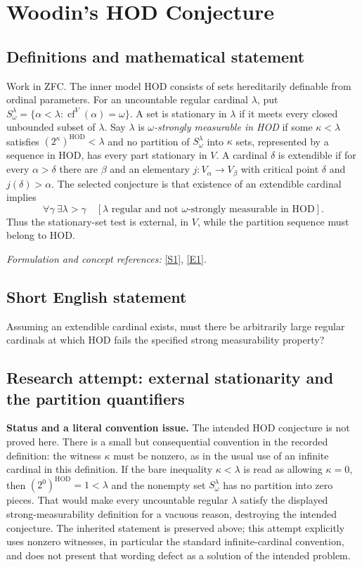 \documentclass[11pt]{article}
\begin{document}
\section*{\texorpdfstring{Woodin's HOD Conjecture}{Woodin's HOD Conjecture}}\label{statement}
\subsection{Definitions and mathematical statement}
Work in ZFC. The inner model $\mathrm{HOD}$ consists of sets hereditarily definable from ordinal parameters. For an uncountable regular cardinal $\lambda$, put $S^\lambda_\omega=\{\alpha<\lambda:\operatorname{cf}^V(\alpha)=\omega\}$. A set is stationary in $\lambda$ if it meets every closed unbounded subset of $\lambda$. Say $\lambda$ is \emph{$\omega$-strongly measurable in HOD} if some $\kappa<\lambda$ satisfies $(2^\kappa)^{\mathrm{HOD}}<\lambda$ and no partition of $S^\lambda_\omega$ into $\kappa$ sets, represented by a sequence in HOD, has every part stationary in $V$. A cardinal $\delta$ is extendible if for every $\alpha>\delta$ there are $\beta$ and an elementary $j:V_\alpha\to V_\beta$ with critical point $\delta$ and $j(\delta)>\alpha$. The selected conjecture is that existence of an extendible cardinal implies
\[
 \forall\gamma\ \exists\lambda>\gamma\quad
 [\lambda\text{ regular and not $\omega$-strongly measurable in HOD}].
\]
Thus the stationary-set test is external, in $V$, while the partition sequence must belong to HOD.
\par\smallskip\textit{Formulation and concept references:} \href{http://panhellenic-logic-symposium.org/12/slides/Day2_Bagaria.pdf}{[S1]}, \href{https://arxiv.org/html/1605.00613v1}{[E1]}.

\subsection{Short English statement}
Assuming an extendible cardinal exists, must there be arbitrarily large regular cardinals at which HOD fails the specified strong measurability property?
\subsection{Research attempt: external stationarity and the partition quantifiers}
\textbf{Status and a literal convention issue.} The intended HOD conjecture is not proved here. There is a small but consequential convention in the recorded definition: the witness $\kappa$ must be nonzero, as in the usual use of an infinite cardinal in this definition. If the bare inequality $\kappa<\lambda$ is read as allowing $\kappa=0$, then $(2^0)^{\mathrm{HOD}}=1<\lambda$ and the nonempty set $S^\lambda_\omega$ has no partition into zero pieces. That would make every uncountable regular $\lambda$ satisfy the displayed strong-measurability definition for a vacuous reason, destroying the intended conjecture. The inherited statement is preserved above; this attempt explicitly uses nonzero witnesses, in particular the standard infinite-cardinal convention, and does not present that wording defect as a solution of the intended problem.
\end{document}
